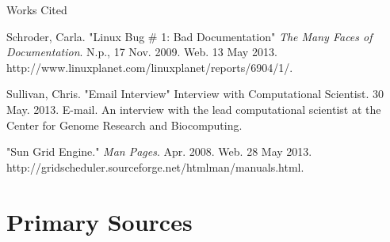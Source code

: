\documentclass[a4paper,12pt]{article}
\newcommand{\bibent}{\noindent \hangindent 40pt}
\newenvironment{workscited}{ \doublespacing \newpage \begin{center} Works Cited \end{center}}{\newpage }
\begin{document}
\begin{workscited}
 \bibent
  Schroder, Carla. "Linux Bug \# 1: Bad Documentation" \textit{The Many Faces of Documentation}. N.p., 17 Nov. 2009. Web. 13 May 2013.\\ http://www.linuxplanet.com/linuxplanet/reports/6904/1/. 
  
   \bibent
   Sullivan, Chris. "Email Interview" Interview with Computational Scientist. 30 May. 2013. E-mail. An interview with the lead computational scientist at the Center for Genome Research and Biocomputing.
   
  \bibent
  "Sun Grid Engine." \textit{Man Pages}. Apr. 2008. Web. 28 May 2013. \\ http://gridscheduler.sourceforge.net/htmlman/manuals.html.
  
  
  







 \end{workscited}
 \newpage
 \section{Primary Sources}
\end{document}
